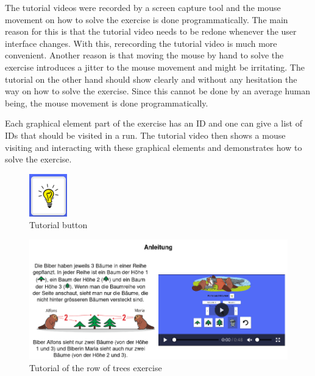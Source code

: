 The tutorial videos were recorded by a screen capture tool and the mouse movement on how to solve the exercise is done programmatically. The main reason for this is that the tutorial video needs to be redone whenever the user interface changes. With this, rerecording the tutorial video is much more convenient. Another reason is that moving the mouse by hand to solve the exercise introduces a jitter to the mouse movement and might be irritating. The tutorial on the other hand should show clearly and without any hesitation the way on how to solve the exercise. Since this cannot be done by an average human being, the mouse movement is done programmatically. 

Each graphical element part of the exercise has an ID and one can give a list of IDs that should be visited in a run. The tutorial video then shows a mouse visiting and interacting with these graphical elements and demonstrates how to solve the exercise. 

\begin{figure}[h]
    \centering
    \includegraphics[width=0.1\columnwidth]{figures/tutorial_button.png}
    \caption{Tutorial button}
    \label{fig:tutorialButton} 
\end{figure}
\begin{figure}[h]
    \centering
    \includegraphics[width=0.5\columnwidth]{figures/tutorial_example.png}
    \caption{Tutorial of the row of trees exercise}
    \label{fig:tutorialExample} 
\end{figure}